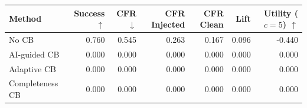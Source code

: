 \begin{tabular}{lrrrrrr}
\toprule
Method & Success $\uparrow$ & CFR $\downarrow$ & CFR Injected & CFR Clean & Lift & Utility ($c=5$) $\uparrow$ \\
\midrule
No CB & 0.760 & 0.545 & 0.263 & 0.167 & 0.096 & -0.440 \\
AI-guided CB & 0.000 & 0.000 & 0.000 & 0.000 & 0.000 & 0.000 \\
Adaptive CB & 0.000 & 0.000 & 0.000 & 0.000 & 0.000 & 0.000 \\
Completeness CB & 0.000 & 0.000 & 0.000 & 0.000 & 0.000 & 0.000 \\
\bottomrule
\end{tabular}
